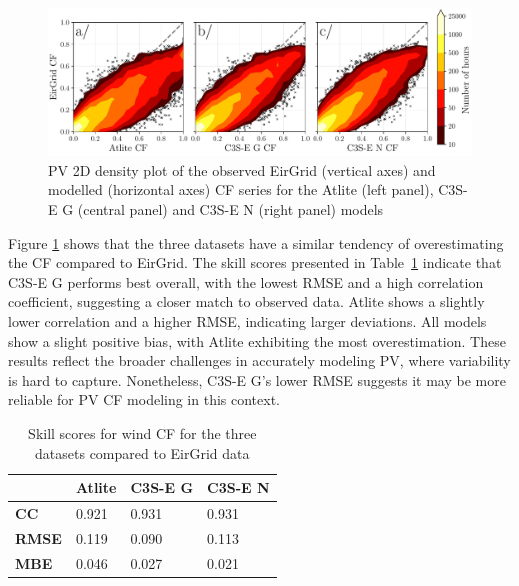 \documentclass[a4paper, 11pt]{article}
\begin{document}
\begin{figure}[h!]
	\centering
	\includegraphics[width=\textwidth]{verification_pv_contour}
	\caption{PV 2D density plot of the observed EirGrid (vertical axes) and modelled (horizontal axes) CF series for the Atlite  (left panel), C3S-E G (central panel) and C3S-E N (right panel) models}	
	\label{fig:solar_verification_contour}
\end{figure}

Figure \ref{fig:solar_verification_contour} shows that the three datasets have a similar tendency of overestimating the CF compared to EirGrid. The skill scores presented in Table~\ref{tab:pv_skill_scores} indicate that C3S-E G performs best overall, with the lowest RMSE and a high correlation coefficient, suggesting a closer match to observed data. Atlite shows a slightly lower correlation and a higher RMSE, indicating larger deviations. All models show a slight positive bias, with Atlite exhibiting the most overestimation. These results reflect the broader challenges in accurately modeling PV, where variability is hard to capture. Nonetheless, C3S-E G’s lower RMSE suggests it may be more reliable for PV CF modeling in this context.

\begin{table}[!ht]
	\centering
	\begin{tabular}{l|lll|}
	\cline{2-4}
	& \textbf{Atlite} & \textbf{C3S-E G} & \textbf{C3S-E N} \\ \hline
	\multicolumn{1}{|l|}{\textbf{CC}}   & 0.921           & 0.931            & 0.931            \\ \hline
	\multicolumn{1}{|l|}{\textbf{RMSE}} & 0.119           & 0.090            & 0.113            \\ \hline
	\multicolumn{1}{|l|}{\textbf{MBE}}   & 0.046           & 0.027           & 0.021           \\ \hline
	\end{tabular}
	\caption{Skill scores for wind CF for the three datasets compared to EirGrid data}
	\label{tab:pv_skill_scores}
\end{table}
\end{document}
